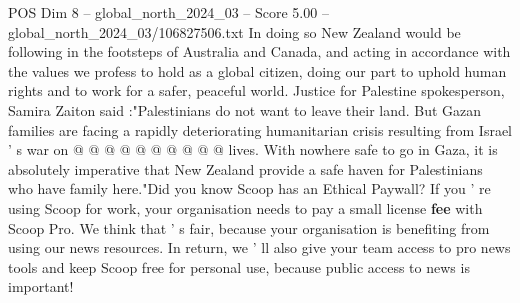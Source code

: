 \begin{textsample}{POS Dim 8 – global\_north\_2024\_03 – Score 5.00 – global\_north\_2024\_03/106827506.txt}
In doing so New Zealand would be following in the footsteps of Australia and Canada, and acting in accordance with the values we profess to hold as a global citizen, doing our part to uphold human rights and to work for a safer, peaceful world.
Justice for Palestine spokesperson, Samira Zaiton said :"Palestinians do not want to leave their land.
But Gazan families are facing a rapidly deteriorating humanitarian crisis resulting from Israel ' s war on @ @ @ @ @ @ @ @ @ @ lives.
With nowhere safe to go in Gaza, it is absolutely imperative that New Zealand provide a safe haven for Palestinians who have family here."Did you know Scoop has an Ethical Paywall?
If you ' re using Scoop for work, your organisation needs to pay a small license \textbf{fee} with Scoop Pro.
We think that ' s fair, because your organisation is benefiting from using our news resources.
In return, we ' ll also give your team access to pro news tools and keep Scoop free for personal use, because public access to news is important!

\end{textsample}
